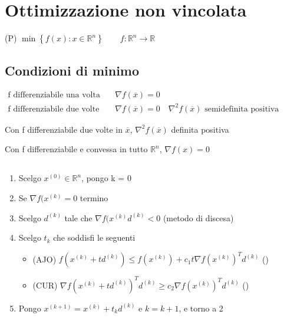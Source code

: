 \chapter{Ottimizzazione non vincolata}
(P) $ \min \left\lbrace f(x) : x \in \mathbb{R}^n \right\rbrace \qquad f:\mathbb{R}^n \rightarrow \mathbb{R} $

\section{Condizioni di minimo}
 $ \begin{array}{ll}
\text{f differenziabile una volta} & \quad \nabla f(\overline{x}) = 0 \\
\text{f differenziabile due volte} & \quad \nabla f(\overline{x}) = 0 \quad \nabla^2 f(\overline{x}) \text{ semidefinita positiva}
\end{array} $

\askip

Con f differenziabile due volte in $ \overline{x} $,  $ \nabla^2 f(\overline{x}) $ definita positiva

\askip

Con f differenziabile e convessa in tutto $ \mathbb{R}^n $,  $ \nabla f(x) = 0 $

\section{}
\begin{proc}\label{proc:metodogradiente}
\begin{enumerate}
\item Scelgo $ x^{(0)} \in \mathbb{R}^n $, pongo k = 0
\item Se $ \nabla f(x^{(k)} = 0 $ termino
\item Scelgo $ d^{(k)} $ tale che $ \nabla f(x^{(k)} d^{(k)} < 0 $ (metodo di discesa)
\item Scelgo $ t_k $ che soddisfi le seguenti 
\begin{itemize}
\item (AJO) $ f(x^{(k)} + t d^{(k)}) \leq f(x^{(k)}) + c_1 t \nabla f(x^{(k)})^T d^{(k)} $ ()
\item (CUR) $ \nabla f(x^{(k)} + t d^{(k)})^T d^{(k)} \geq c_2 \nabla f(x^{(k)})^T d^{(k)} $ ()
\end{itemize}
\item Pongo $ x^{(k+1)} = x^{(k)} + t_k d^{(k)} $ e $ k = k+1 $, e torno a 2
\end{enumerate}
\end{proc}

